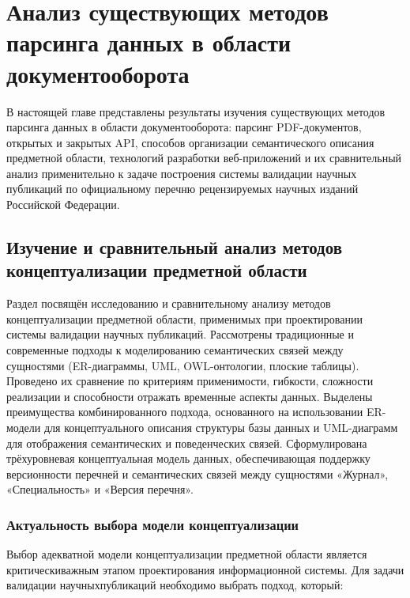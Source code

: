\chapter{Анализ существующих методов парсинга данных в области документооборота}
\label{chapter1}

В настоящей главе представлены результаты изучения существующих 
методов парсинга данных в области документооборота: парсинг PDF-документов,
открытых и закрытых API, способов организации семантического описания предметной области, 
технологий разработки веб-приложений и их сравнительный анализ применительно
к задаче построения системы валидации научных публикаций по официальному перечню
рецензируемых научных изданий Российской Федерации.

\section{Изучение и сравнительный анализ методов концептуализации предметной области}

\begin{annotation}
	Раздел посвящён исследованию и сравнительному анализу методов концептуализации 
	предметной области, применимых при проектировании системы валидации научных публикаций. 
	Рассмотрены традиционные и современные подходы к моделированию
    семантических связей между сущностями (ER-диаграммы, UML, OWL-онтологии, плоские
	таблицы). Проведено их сравнение по критериям применимости, гибкости, сложности реализации 
	и способности отражать временные аспекты данных. Выделены преимущества
	комбинированного подхода, основанного на использовании ER-модели для концептуального
	описания структуры базы данных и UML-диаграмм для отображения семантических и поведенческих связей. 
	Сформулирована трёхуровневая концептуальная модель данных, обеспечивающая 
	поддержку версионности перечней и семантических связей между сущностями «Журнал», «Специальность» и «Версия перечня».
\end{annotation}


\subsection{Актуальность выбора модели концептуализации}

Выбор адекватной модели концептуализации предметной области
является критическиважным этапом проектирования информационной системы.
Для задачи валидации научныхпубликаций необходимо выбрать подход, который:

